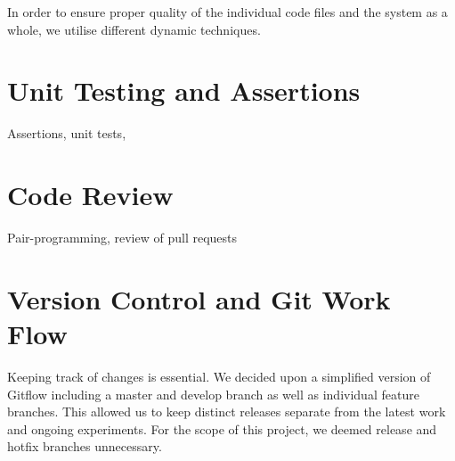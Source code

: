 In order to ensure proper quality of the individual code files and the system as a whole, we utilise different dynamic techniques.

\section{Unit Testing and Assertions}
Assertions, unit tests, 

\section{Code Review}
Pair-programming, review of pull requests

\section{Version Control and Git Work Flow}
Keeping track of changes is essential. We decided upon a simplified version of Gitflow including a master and develop branch as well as individual feature branches. This allowed us to keep distinct releases separate from the latest work and ongoing experiments. For the scope of this project, we deemed release and hotfix branches unnecessary.
